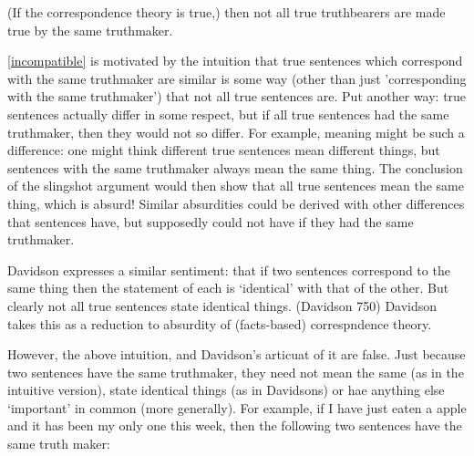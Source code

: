 

	\begin{thesis} \label{incompatible}
	(If the correspondence theory is true,) then not all true truthbearers are made true by the same truthmaker.
	\end{thesis}

\ref{incompatible} is motivated by the intuition that true sentences which correspond with the same truthmaker are similar is some way (other than just 'corresponding with the same truthmaker') that not all true sentences are.
Put another way: true sentences actually differ in some respect, but if all true sentences had the same truthmaker, then they would not so differ.
For example, meaning might be such a difference: one might think different true sentences mean different things, but sentences with the same truthmaker always mean the same thing.
The conclusion of the slingshot argument would then show that all true sentences mean the same thing, which is absurd!
Similar absurdities could be derived with other differences that sentences have, but supposedly could not have if they had the same truthmaker.

Davidson expresses a similar sentiment: that if two sentences correspond to the same thing then the statement of each is `identical' with that of the other.
But clearly not all true sentences state identical things.
(Davidson 750)
Davidson takes this as a reduction to absurdity of (facts-based) correspndence theory.  %


However, the above intuition, and Davidson's articuat of it are false.
Just because two sentences have the same truthmaker, they need not mean the same (as in the intuitive version), state identical things (as in Davidsons) or hae anything else `important' in common (more generally).
For example, if I have just eaten a apple and it has been my only one this week, then the following two sentences have the same truth maker:

